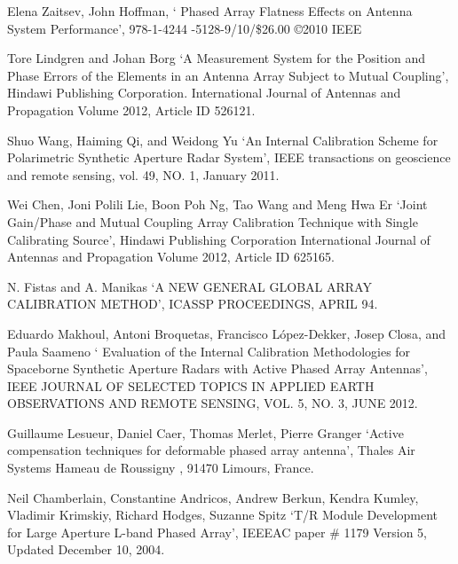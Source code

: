 \documentclass[a4paper,10pt]{article}
\begin{document}
\begin{enumerate}[ {[}1{]} ]
		\item \label{ppr:aligment5} Elena Zaitsev, John Hoffman, \enquote*{
		Phased Array Flatness Effects on Antenna System Performance}, 978-1-4244
		-5128-9/10/\$26.00 \copyright 2010 IEEE

		
		\item Tore Lindgren and Johan Borg \enquote*{A Measurement System for 
		the Position and Phase Errors of the Elements in an Antenna Array 
		Subject to Mutual Coupling}, Hindawi Publishing Corporation. 
		International Journal of Antennas and Propagation Volume 2012, 
		Article ID 526121.

		\item \label{ppr:classic7} Shuo Wang, Haiming Qi, and Weidong Yu 
		\enquote*{An Internal Calibration Scheme for Polarimetric Synthetic 
		Aperture Radar System}, IEEE transactions on geoscience and remote 
		sensing, vol. 49, NO. 1, January 2011.
		
		\item \label{ppr:mutual-ext1} Wei Chen, Joni Polili Lie, Boon Poh Ng, 
		Tao Wang and Meng Hwa Er \enquote*{Joint Gain/Phase and Mutual Coupling
		Array Calibration Technique with Single Calibrating Source}, Hindawi 
		Publishing Corporation International Journal of Antennas and Propagation
		Volume 2012, Article ID 625165.

		
		\item N. Fistas and A. Manikas \enquote*{A NEW GENERAL GLOBAL ARRAY 
		CALIBRATION METHOD}, ICASSP PROCEEDINGS, APRIL 94.
		
		\item \label{ppr:classic8} Eduardo Makhoul, Antoni Broquetas, 
		Francisco López-Dekker, Josep Closa, and Paula Saameno \enquote*{
		Evaluation of the Internal Calibration Methodologies for Spaceborne 
		Synthetic Aperture Radars with Active Phased Array Antennas}, IEEE 
		JOURNAL OF SELECTED TOPICS IN APPLIED EARTH OBSERVATIONS AND REMOTE 
		SENSING, VOL. 5, NO. 3, JUNE 2012.

		\item \label{ppr:aligment6} Guillaume Lesueur, Daniel Caer, Thomas 
		Merlet, Pierre Granger \enquote*{Active compensation techniques for 
		deformable phased array antenna}, Thales Air Systems Hameau de Roussigny
		, 91470 Limours, France.

		\item Neil Chamberlain, Constantine Andricos, Andrew Berkun, Kendra 
		Kumley, Vladimir Krimskiy, Richard Hodges, Suzanne Spitz \enquote*{T/R 
		Module Development for Large Aperture L-band Phased Array}, IEEEAC paper
		\# 1179 Version 5, Updated December 10, 2004.

	\end{enumerate}
\end{document}
